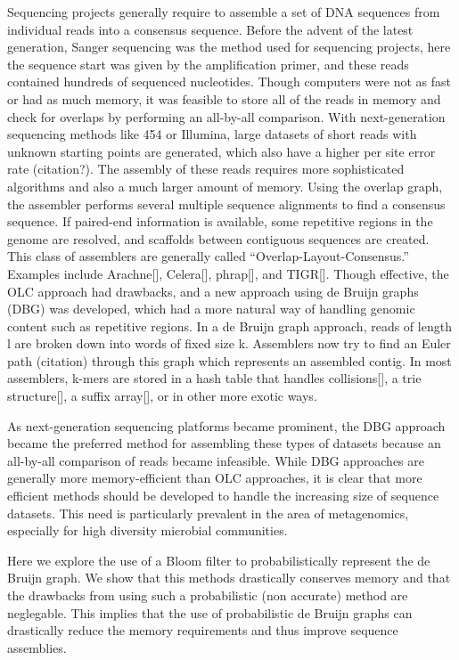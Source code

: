 \documentclass[12pt]{article} \usepackage{simplemargins}
\begin{document}
Sequencing projects generally require to assemble a set of DNA
sequences from individual reads into a consensus sequence. Before the
advent of the latest generation, Sanger sequencing was the method used
for sequencing projects, here the sequence start was given by the
amplification primer, and these reads contained hundreds of sequenced
nucleotides. Though computers were not as fast or had as much memory,
it was feasible to store all of the reads in memory and check for
overlaps by performing an all-by-all comparison. With next-generation
sequencing methods like 454 or Illumina, large datasets of short reads
with unknown starting points are generated, which also have a higher per site
error rate (citation?). The assembly of these
reads requires more sophisticated algorithms and also a much larger
amount of memory. Using the overlap graph, the assembler performs
several multiple sequence alignments to find a consensus sequence. If
paired-end information is available, some repetitive regions in the
genome are resolved, and scaffolds between contiguous sequences are
created. This class of assemblers are generally called
“Overlap-Layout-Consensus.” Examples include Arachne[], Celera[],
phrap[], and TIGR[]. Though effective, the OLC approach had drawbacks,
and a new approach using de Bruijn graphs (DBG) was 
developed\cite{pmid11504945}, which
had a more natural way of handling genomic content such as repetitive
regions. In a de Bruijn graph approach, reads of length l are broken
down into words of fixed size k. Assemblers now try to find an Euler
path (citation) through this graph which represents an assembled
contig. In most assemblers, k-mers are stored in a hash table that
handles collisions[], a trie structure[], a suffix array[], or in
other more exotic ways.

As next-generation sequencing platforms became prominent, the DBG approach
became the preferred method for assembling these types of datasets
because an all-by-all comparison of reads became infeasible. While DBG
approaches are generally more memory-efficient than OLC approaches, it
is clear that more efficient methods should be developed to handle the
increasing size of sequence datasets. This need is particularly
prevalent in the area of metagenomics, especially for high diversity
microbial communities.

Here we explore the use of a Bloom filter to probabilistically
represent the de Bruijn graph. We show that this methods drastically
conserves memory and that the drawbacks from using such a
probabilistic (non accurate) method are neglegable. This implies that
the use of probabilistic de Bruijn graphs can drastically reduce the
memory requirements and thus improve sequence assemblies.
\end{document}
